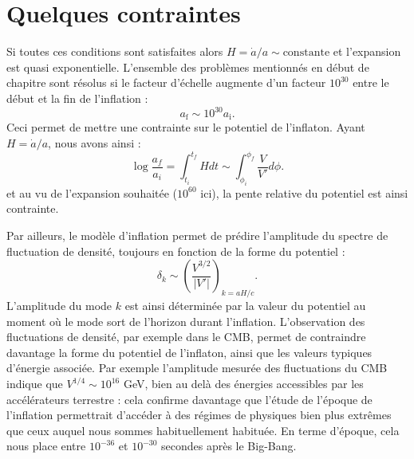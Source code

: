 \section{Quelques contraintes}
Si toutes ces conditions sont satisfaites alors $H=\dot a /a \sim \mathrm{constante}$ et l'expansion est quasi exponentielle. L'ensemble des problèmes mentionnés en début de chapitre sont résolus si le facteur d'échelle augmente d'un facteur $10^{30}$ entre le début et la fin de l'inflation :
\begin{equation}
a_\mathrm{f}\sim 10^{30} a_\mathrm{i}.
\end{equation}
Ceci permet de mettre une contrainte sur le potentiel de l'inflaton. Ayant $H=\dot a/a$, nous avons ainsi :
\begin{equation}
\log \frac{a_f}{a_i}=\int_{t_i}^{t_f} H dt \sim \int_{\phi_i}^{\phi_f}\frac{V}{V'}d \phi.
\end{equation}
et au vu de l'expansion souhaitée ($10^{60}$ ici), la pente relative du potentiel est ainsi contrainte.

Par ailleurs, le modèle d'inflation permet de prédire l'amplitude du spectre de fluctuation de densité, toujours en fonction de la forme du potentiel :
\begin{equation}
\delta_k\sim \left(\frac{V^{3/2}}{|V'|}\right)_{k=aH/c}.
\end{equation}
L'amplitude du mode $k$ est ainsi déterminée par la valeur du potentiel au moment où le mode sort de l'horizon durant l'inflation. L'observation des fluctuations de densité, par exemple dans le CMB, permet de contraindre davantage la forme du potentiel de l'inflaton, ainsi que les valeurs typiques d'énergie associée. Par exemple l'amplitude mesurée des fluctuations du CMB indique que $V^{1/4}\sim 10^{16}$ GeV, bien au delà des énergies accessibles par les accélérateurs terrestre : cela confirme davantage que l'étude de l'époque de l'inflation permettrait d'accéder à des régimes de physiques bien plus extrêmes que ceux auquel nous sommes habituellement habituée. En terme d'époque, cela nous place entre $10^{-36}$ et $10^{-30}$ secondes après le Big-Bang. 

